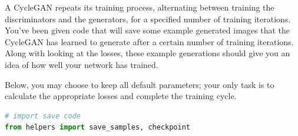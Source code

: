 A CycleGAN repeats its training process, alternating between training
the discriminators and the generators, for a specified number of
training iterations. You've been given code that will save some example
generated images that the CycleGAN has learned to generate after a
certain number of training iterations. Along with looking at the losses,
these example generations should give you an idea of how well your
network has trained.\newline

Below, you may choose to keep all default parameters; your only task is
to calculate the appropriate losses and complete the training cycle.

\begin{lstlisting}[language=Python]
# import save code
from helpers import save_samples, checkpoint
\end{lstlisting}

